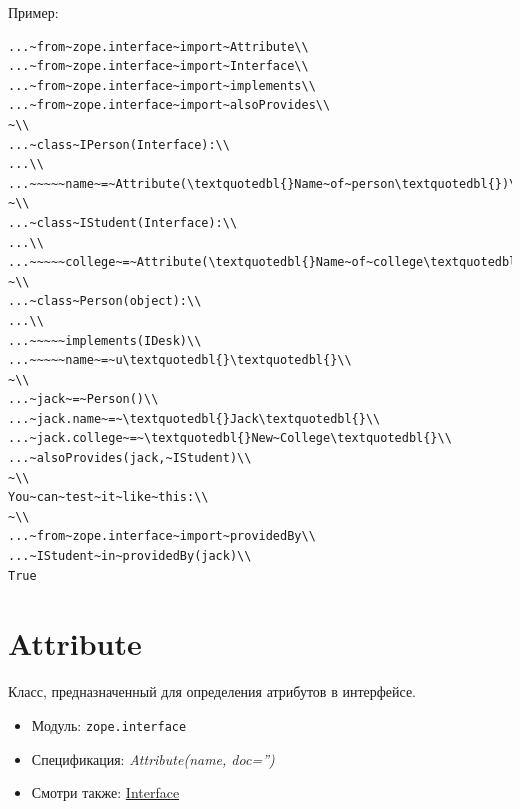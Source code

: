 \documentclass[a4paper,openany,twoside,draft]{book}
\providecommand*{\DUroletitlereference}[1]{\textsl{#1}}
\begin{document}
Пример:

\begin{verbatim}
...~from~zope.interface~import~Attribute\\
...~from~zope.interface~import~Interface\\
...~from~zope.interface~import~implements\\
...~from~zope.interface~import~alsoProvides\\
~\\
...~class~IPerson(Interface):\\
...\\
...~~~~~name~=~Attribute(\textquotedbl{}Name~of~person\textquotedbl{})\\
~\\
...~class~IStudent(Interface):\\
...\\
...~~~~~college~=~Attribute(\textquotedbl{}Name~of~college\textquotedbl{})\\
~\\
...~class~Person(object):\\
...\\
...~~~~~implements(IDesk)\\
...~~~~~name~=~u\textquotedbl{}\textquotedbl{}\\
~\\
...~jack~=~Person()\\
...~jack.name~=~\textquotedbl{}Jack\textquotedbl{}\\
...~jack.college~=~\textquotedbl{}New~College\textquotedbl{}\\
...~alsoProvides(jack,~IStudent)\\
~\\
You~can~test~it~like~this:\\
~\\
...~from~zope.interface~import~providedBy\\
...~IStudent~in~providedBy(jack)\\
True
\end{verbatim}


\section*{Attribute%
  \label{attribute}%
}

Класс, предназначенный для определения атрибутов в интерфейсе.

\begin{itemize}

\item Модуль: \texttt{zope.interface}

\item Спецификация: \DUroletitlereference{Attribute(name, doc='')}

\item Смотри также: \hyperref[interface]{Interface}

\end{itemize}
\end{document}
